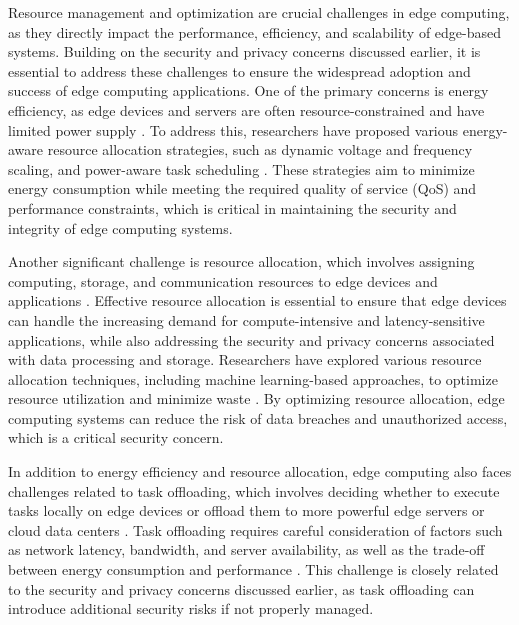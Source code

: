 \documentclass[11pt]{article}
\begin{document}
Resource management and optimization are crucial challenges in edge computing, as they directly impact the performance, efficiency, and scalability of edge-based systems. Building on the security and privacy concerns discussed earlier, it is essential to address these challenges to ensure the widespread adoption and success of edge computing applications. One of the primary concerns is energy efficiency, as edge devices and servers are often resource-constrained and have limited power supply \cite{ref50}. To address this, researchers have proposed various energy-aware resource allocation strategies, such as dynamic voltage and frequency scaling, and power-aware task scheduling \cite{ref51}. These strategies aim to minimize energy consumption while meeting the required quality of service (QoS) and performance constraints, which is critical in maintaining the security and integrity of edge computing systems.

Another significant challenge is resource allocation, which involves assigning computing, storage, and communication resources to edge devices and applications \cite{ref52}. Effective resource allocation is essential to ensure that edge devices can handle the increasing demand for compute-intensive and latency-sensitive applications, while also addressing the security and privacy concerns associated with data processing and storage. Researchers have explored various resource allocation techniques, including machine learning-based approaches, to optimize resource utilization and minimize waste \cite{ref53}. By optimizing resource allocation, edge computing systems can reduce the risk of data breaches and unauthorized access, which is a critical security concern.

In addition to energy efficiency and resource allocation, edge computing also faces challenges related to task offloading, which involves deciding whether to execute tasks locally on edge devices or offload them to more powerful edge servers or cloud data centers \cite{ref54}. Task offloading requires careful consideration of factors such as network latency, bandwidth, and server availability, as well as the trade-off between energy consumption and performance \cite{ref55}. This challenge is closely related to the security and privacy concerns discussed earlier, as task offloading can introduce additional security risks if not properly managed.
\end{document}
